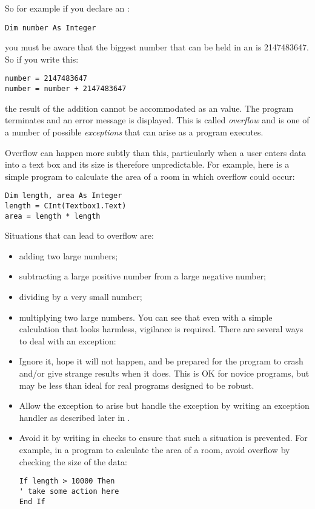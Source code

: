 		So for example if you declare an :
		\begin{lstlisting}
Dim number As Integer
		\end{lstlisting}
		you must be aware that the biggest number that can be held in an  is 2147483647. So if you write this:
		\begin{lstlisting}
number = 2147483647
number = number + 2147483647
		\end{lstlisting}
		the result of the addition cannot be accommodated as an  value. The program terminates and an error message is displayed. This is called \emph{overflow} and is one of a number of possible \emph{exceptions} that can arise as a program executes.
		
		Overflow can happen more subtly than this, particularly when a user enters data into a text box and its size is therefore unpredictable. For example, here is a simple program to calculate the area of a room in which overflow could occur:
		\begin{lstlisting}
Dim length, area As Integer
length = CInt(Textbox1.Text)
area = length * length
		\end{lstlisting}
		Situations that can lead to overflow are:
		\begin{itemize}
      \item adding two large numbers;
      \item subtracting a large positive number from a large negative number;
      \item dividing by a very small number;
      \item multiplying two large numbers.
				You can see that even with a simple calculation that looks harmless, vigilance is required. There are several ways to deal with an exception:
      \item Ignore it, hope it will not happen, and be prepared for the program to crash and/or give strange results when it does. This is OK for novice programs, but may be less than ideal for real programs designed to be robust.
			\item Allow the exception to arise but handle the exception by writing an exception handler as described later in .
      \item Avoid it by writing in checks to ensure that such a situation is prevented. For example, in a program to calculate the area of a room, avoid overflow by checking the size of the data:
				\begin{lstlisting}
If length > 10000 Then
' take some action here
End If
				\end{lstlisting}
		\end{itemize}

